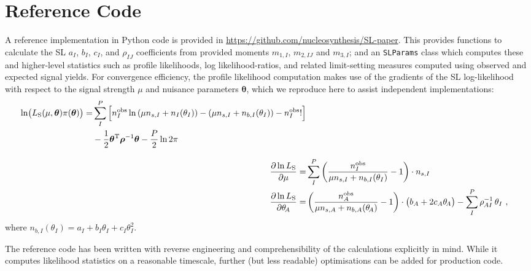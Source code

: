 \documentclass[11pt]{article}
\begin{document}
\section{Reference Code}
\label{sec:reference_code}

A reference implementation in Python code is provided in
\url{https://github.com/nucleosynthesis/SL-paper}.  This provides functions to
calculate the SL $a_I$, $b_I$, $c_I$, and $\rho_{IJ}$ coefficients from provided
moments $m_{1,I}$, $m_{2,IJ}$ and $m_{3,I}$; and an \texttt{SLParams} class
which computes these and higher-level statistics such as profile likelihoods,
log likelihood-ratios, and related limit-setting measures computed using
observed and expected signal yields. For convergence efficiency, the profile
likelihood computation makes use of the gradients of the SL log-likelihood with
respect to the signal strength $\mu$ and nuisance parameters $\bm{\theta}$,
which we reproduce here to assist independent implementations:
%
\begin{align}
  \begin{split}
    \ln\! \big( L_{\rm{S}}(\mu,\bm{\theta} )\pi(\bm{\theta}) \big) =&
    \sum_I^P \Big[ n^{\rm{obs}}_{I} \ln \left(\mu n_{s,I} + n_{I}(\theta_{I}) \right) - \left( \mu n_{s,I} + n_{b,I}(\theta_{I}) \right) - n^{\rm{obs}}_{I}! \Big]\\
    &- \frac{1}{2} \bm{\theta}^\mathrm{T} \bm{\rho}^{-1} \bm{\theta} - \frac{P}{2} \ln 2\pi
  \end{split}\\[2ex]
  \frac{\partial\ln L_{\rm{S}}}{\partial\mu} =& \sum_I^P \left( \frac{n^{\rm{obs}}_I}{\mu n_{s,I} + n_{b,I}(\theta_{I})} - 1 \right) \cdot n_{s,I} \\
  \frac{\partial\ln L_{\rm{S}}}{\partial\theta_{\!A}} =& \left( \frac{n^{\rm{obs}}_A}{\mu n_{s,A} + n_{b,A}(\theta_{\!A}) } - 1 \right) \cdot \big( b_A + 2 c_A \theta_{\!A} \big) - \sum_I^P \rho_{\mspace{-1mu}AI}^{-1} \, \theta_I ~,
\label{eq:SL_LHC}
\end{align}
%
where $n_{b,I}(\theta_{I}) = a_{I} + b_{I}\theta_{I} + c_{I}\theta_{I}^{2}$.

The reference code has been written with reverse engineering and
comprehensibility of the calculations explicitly in mind. While it computes
likelihood statistics on a reasonable timescale, further (but less readable)
optimisations can be added for production code.





\end{document}
